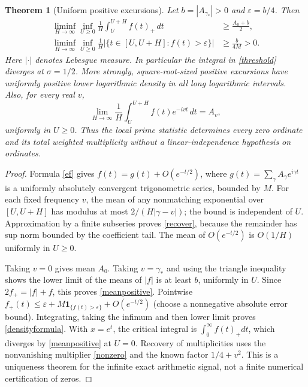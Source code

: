 \documentclass[11pt]{article}
\newtheorem{theorem}{Theorem}
\theoremstyle{remark}\newtheorem{remark}[theorem]{Remark}
\newcommand{\ind}{\mathbf{1}}
\begin{document}
\begin{theorem}[Uniform positive excursions]\label{density}
Let $b=|A_{\gamma_*}|>0$ and $\varepsilon=b/4$. Then
\begin{align}
 \liminf_{H\to\infty}\inf_{U\ge0}\frac1H\int_U^{U+H}f(t)_+\,dt&\ge\frac{A_0+b}{2},\label{meanpositive}\\
 \liminf_{H\to\infty}\inf_{U\ge0}\frac1H\left|\{t\in[U,U+H]:f(t)>\varepsilon\}\right|&\ge\frac{b}{4M}>0.\label{densityformula}
\end{align}
Here $|\cdot|$ denotes Lebesgue measure. In particular the integral in \eqref{threshold} diverges at $\sigma=1/2$. More strongly, square-root-sized positive excursions have uniformly positive lower logarithmic density in all long logarithmic intervals. Also, for every real $v$,
\begin{equation}\label{recover}
 \lim_{H\to\infty}\frac1H\int_U^{U+H}f(t)e^{-ivt}\,dt=A_v,
\end{equation}
uniformly in $U\ge0$. Thus the local prime statistic determines every zero ordinate and its total weighted multiplicity without a linear-independence hypothesis on ordinates.
\end{theorem}
\begin{proof}
Formula \eqref{ef} gives $f(t)=g(t)+O(e^{-t/2})$, where $g(t)=\sum_\gamma A_\gamma e^{i\gamma t}$ is a uniformly absolutely convergent trigonometric series, bounded by $M$. For each fixed frequency $v$, the mean of any nonmatching exponential over $[U,U+H]$ has modulus at most $2/(H|\gamma-v|)$; the bound is independent of $U$. Approximation by a finite subseries proves \eqref{recover}, because the remainder has sup norm bounded by the coefficient tail. The mean of $O(e^{-t/2})$ is $O(1/H)$ uniformly in $U\ge0$.

Taking $v=0$ gives mean $A_0$. Taking $v=\gamma_*$ and using the triangle inequality shows the lower limit of the means of $|f|$ is at least $b$, uniformly in $U$. Since $2f_+=|f|+f$, this proves \eqref{meanpositive}. Pointwise $f_+(t)\le \varepsilon+M\ind_{\{f(t)>\varepsilon\}}+O(e^{-t/2})$ (choose a nonnegative absolute error bound). Integrating, taking the infimum and then lower limit proves \eqref{densityformula}. With $x=e^t$, the critical integral is $\int_0^\infty f(t)_+dt$, which diverges by \eqref{meanpositive} at $U=0$. Recovery of multiplicities uses the nonvanishing multiplier \eqref{nonzero} and the known factor $1/4+v^2$. This is a uniqueness theorem for the infinite exact arithmetic signal, not a finite numerical certification of zeros.
\end{proof}
\end{document}
